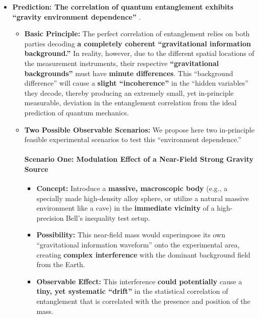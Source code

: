 \documentclass[11pt, a4paper]{article}
\begin{document}
\begin{itemize}
    \item \textbf{Prediction: The correlation of quantum entanglement exhibits ``gravity environment dependence''} \cite{Bell1964}.

    \begin{itemize}
        \item \textbf{Basic Principle:}
        The perfect correlation of entanglement relies on both parties decoding \textbf{a completely coherent ``gravitational information background.''} In reality, however, due to the different spatial locations of the measurement instruments, their respective \textbf{``gravitational backgrounds''} must have \textbf{minute differences}. This ``background difference'' will cause a \textbf{slight ``incoherence''} in the ``hidden variables'' they decode, thereby producing an extremely small, yet in-principle measurable, deviation in the entanglement correlation from the ideal prediction of quantum mechanics.

        \item \textbf{Two Possible Observable Scenarios:}
        We propose here two in-principle feasible experimental scenarios to test this ``environment dependence.''

        \paragraph{Scenario One: Modulation Effect of a Near-Field Strong Gravity Source}
        \begin{itemize}
            \item \textbf{Concept:} Introduce a \textbf{massive, macroscopic body} (e.g., a specially made high-density alloy sphere, or utilize a natural massive environment like a cave) in the \textbf{immediate vicinity} of a high-precision Bell's inequality test setup.
            \item \textbf{Possibility:} This near-field mass would superimpose its own ``gravitational information waveform'' onto the experimental area, creating \textbf{complex interference} with the dominant background field from the Earth.
            \item \textbf{Observable Effect:} This interference \textbf{could potentially} cause a \textbf{tiny, yet systematic ``drift''} in the statistical correlation of entanglement that is correlated with the presence and position of the mass.
        \end{itemize}


\end{itemize}
\end{itemize}
\end{document}

